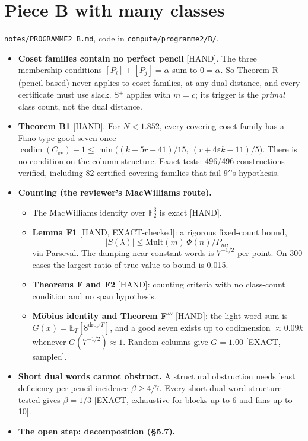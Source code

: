 \documentclass[11pt]{article}
\newcommand{\lvl}[1]{\textsf{\small[#1]}}
\newcommand{\F}{\mathbb{F}_2}
\begin{document}
\section{Piece B with many classes}
\texttt{notes/PROGRAMME2\_B.md}, code in \texttt{compute/programme2/B/}.
\begin{itemize}
\item \textbf{Coset families contain no perfect pencil} \lvl{HAND}. The three membership conditions
$[P_i]+[P_j]=\alpha$ sum to $0=\alpha$. So Theorem R (pencil-based) never applies to coset families, at any dual
distance, and every certificate must use slack. S$^+$ applies with $m=c$; its trigger is the \emph{primal} class count,
not the dual distance.
\item \textbf{Theorem B1} \lvl{HAND}. For $N<1.852$, every covering coset family has a Fano-type good seven once
$\operatorname{codim}(C_{\mathrm{ev}})-1\le\min\big((k-5r-41)/15,\ (r+4\varepsilon k-11)/5\big)$. There is no condition on
the column structure. Exact tests: 496/496 constructions verified, including 82 certified covering families that fail
$9'$'s hypothesis.
\item \textbf{Counting (the reviewer's MacWilliams route).}
  \begin{itemize}
  \item The MacWilliams identity over $\F^3$ is exact \lvl{HAND}.
  \item \textbf{Lemma F1} \lvl{HAND, EXACT-checked}: a rigorous fixed-count bound,
  \[|S(\lambda)|\le\mathrm{Mult}(m)\,\Phi(n)/P_m,\]
  via Parseval. The damping near constant words is $7^{-1/2}$ per point. On 300 cases the
  largest ratio of true value to bound is 0.015.
  \item \textbf{Theorems F and F2} \lvl{HAND}: counting criteria with no class-count condition and no span hypothesis.
  \item \textbf{Möbius identity and Theorem F$'''$} \lvl{HAND}: the light-word sum is
  $G(x)=\mathbb{E}_T[8^{\mathrm{drop}\,T}]$, and a good seven exists up to codimension $\approx0.09k$ whenever
  $G(7^{-1/2})\approx1$. Random columns give $G=1.00$ \lvl{EXACT, sampled}.
  \end{itemize}
\item \textbf{Short dual words cannot obstruct.} A structural obstruction needs least deficiency per pencil-incidence
$\beta\ge4/7$. Every short-dual-word structure tested gives $\beta=1/3$ \lvl{EXACT, exhaustive for blocks up to 6 and fans
up to 10}.
\item \textbf{The open step: decomposition (\S5.7).}

\end{itemize}
\end{document}
